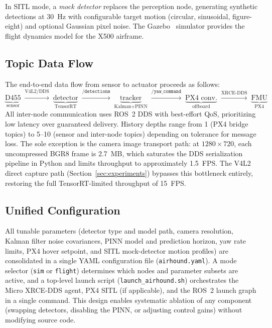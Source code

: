 \documentclass[11pt,letterpaper]{article}
\begin{document}
\noindent
In SITL mode, a \emph{mock detector} replaces the perception node,
generating synthetic detections at 30~Hz with configurable target
motion (circular, sinusoidal, figure-eight) and optional Gaussian
pixel noise.  The Gazebo~\cite{gazebo2004} simulator provides the
flight dynamics model for the X500 airframe.

\subsection{Topic Data Flow}
\label{sec:dataflow}

The end-to-end data flow from sensor to actuator proceeds as follows:
%
\begin{equation*}
\underbrace{\text{D455}}_{\text{sensor}}
\;\xrightarrow{\text{V4L2/DDS}}\;
\underbrace{\text{detector}}_{\text{TensorRT}}
\;\xrightarrow{\texttt{/detections}}\;
\underbrace{\text{tracker}}_{\text{Kalman+PINN}}
\;\xrightarrow{\texttt{/yaw\_command}}\;
\underbrace{\text{PX4 conv.}}_{\text{offboard}}
\;\xrightarrow{\text{XRCE-DDS}}\;
\underbrace{\text{FMU}}_{\text{PX4}}
\end{equation*}
%
All inter-node communication uses ROS~2 DDS with best-effort QoS,
prioritizing low latency over guaranteed delivery.  History depths
range from 1 (PX4 bridge topics) to 5--10 (sensor and inter-node
topics) depending on tolerance for message loss.
The sole exception is the camera image transport path: at
$1280\times720$, each uncompressed BGR8 frame is 2.7~MB, which
saturates the DDS serialization pipeline in Python and limits
throughput to approximately 1.5~FPS.  The V4L2 direct capture path
(Section~\ref{sec:experiments}) bypasses this bottleneck entirely,
restoring the full TensorRT-limited throughput of 15~FPS.

\subsection{Unified Configuration}
\label{sec:config}

All tunable parameters (detector type and model path, camera
resolution, Kalman filter noise covariances, PINN model and
prediction horizon, yaw rate limits, PX4 hover setpoint, and SITL
mock-detector motion profiles) are consolidated in a single YAML
configuration file (\texttt{airhound.yaml}).  A mode selector
(\texttt{sim} or \texttt{flight}) determines which nodes and
parameter subsets are active, and a top-level launch script
(\texttt{launch\_airhound.sh}) orchestrates the Micro XRCE-DDS
agent, PX4 SITL (if applicable), and the ROS~2 launch graph in a
single command.  This design enables systematic ablation of any
component (swapping detectors, disabling the PINN, or adjusting
control gains) without modifying source code.
\end{document}
